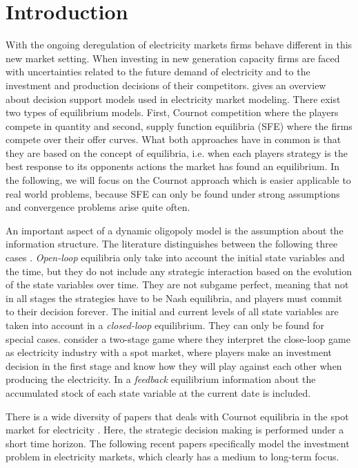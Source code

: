 \section{Introduction}

With the ongoing deregulation of electricity markets firms behave different in this new market setting. When investing in new generation capacity firms are faced with uncertainties related to the future demand of electricity and to the investment and production decisions of their competitors. \cite{Ventosa2005} gives an overview about decision support models used in electricity market modeling. There exist two types of equilibrium models. First, Cournot competition where the players compete in quantity and second, supply function equilibria (SFE) where the firms compete over their offer curves. What both approaches have in common is that they are based on the concept of \cite{Nash1951} equilibria, i.e. when each players strategy is the best response to its opponents actions the market has found an equilibrium. In the following, we will focus on the Cournot approach which is easier applicable to real world problems, because SFE can only be found under strong assumptions and convergence problems arise quite often.

An important aspect of a dynamic oligopoly model is the assumption about the information structure. The literature distinguishes between the following three cases \citep[see, e.g.,][]{Cellini2004}. \emph{Open-loop} equilibria only take into account the initial state variables and the time, but they do not include any strategic interaction based on the evolution of the state variables over time. They are not subgame perfect, meaning that not in all stages the strategies have to be Nash equilibria, and players must commit to their decision forever. The initial and current levels of all state variables are taken into account in a \emph{closed-loop} equilibrium. They can only be found for special cases. \cite{Murphy2005} consider a two-stage game where they interpret the close-loop game as electricity industry with a spot market, where players make an investment decision in the first stage and know how they will play against each other when producing the electricity. In a \emph{feedback} equilibrium information about the accumulated stock of each state variable at the current date is included.

There is a wide diversity of papers that deals with Cournot equilibria in the spot market for electricity \citep[see, e.g.][]{Borenstein1999, Otero-Novas2000}. Here, the strategic decision making is performed under a short time horizon. The following recent papers specifically model the investment problem in electricity markets, which clearly has a medium to long-term focus.

